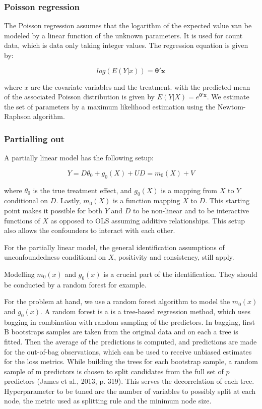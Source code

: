 \subsubsection{Poisson regression}
The Poisson regression assumes that the logarithm of the expected value van be modeled by a linear function of the
unknown parameters. It is used for count data, which is data only taking integer values. The regression equation is given
by:

\begin{equation}
    log(E(Y|x)) = \mathbf{\theta}' \mathbf{x}
\end{equation}

where $x$ are the covariate variables and the treatment.
with the predicted mean of the associated Poisson distribution is given by $E(Y|X) = e^{\mathbf{\theta}'\mathbf{x}}$.
We estimate the set of parameters by a maximum likelihood estimation using the Newtom-Raphson algorithm.

\subsubsection{Partialling out}
A partially linear model has the following setup:

\begin{equation}
    Y = D \theta_0 + g_0(X) + U
    D = m_0(X) + V
\end{equation}

where $\theta_0$ is the true treatment effect, and $g_0(X)$ is a mapping from $X$ to $Y$ conditional on $D$. Lastly,
$m_0(X)$ is a function mapping $X$ to $D$.
This starting point makes it possible for both $Y$ and $D$ to be non-linear and to be interactive functions of $X$ as
opposed to OLS assuming additive relationships. This setup also allows the confounders to interact with each other.

For the partially linear model, the general identification assumptions of unconfoundedness conditional on $X$,
positivity and consistency, still apply.

Modelling $m_0(x)$ and $g_0(x)$ is a crucial part of the identification. They should be conducted by a random forest for example.

For the problem at hand, we use a random forest algorithm to model the $m_0(x)$ and $g_0(x)$. A random forest is a is a
tree-based regression method, which uses bagging in combination with random sampling of the predictors. In bagging, first
B bootstraps samples are taken from the original data and on each a tree is fitted. Then the average of the predictions
is computed, and predictions are made for the out-of-bag observations, which can be used to receive unbiased
estimates for the loss metrics. While building the trees for each bootstrap sample, a random sample of m predictors is
chosen to split candidates from the full set of $p$ predictors (James et al., 2013, p. 319). This serves the
decorrelation of each tree. Hyperparameter to be tuned are the number of variables to possibly split at
each node, the metric used as splitting rule and the minimum node size.

